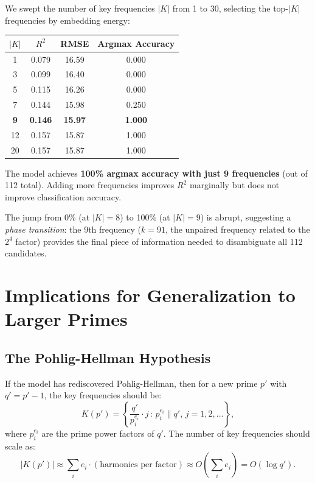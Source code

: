 \documentclass[11pt]{article}
\begin{document}
We swept the number of key frequencies $|K|$ from 1 to 30, selecting the top-$|K|$ frequencies by embedding energy:

\begin{center}
\begin{tabular}{cccc}
\toprule
$|K|$ & $R^2$ & RMSE & Argmax Accuracy \\
\midrule
1 & 0.079 & 16.59 & 0.000 \\
3 & 0.099 & 16.40 & 0.000 \\
5 & 0.115 & 16.26 & 0.000 \\
7 & 0.144 & 15.98 & 0.250 \\
\textbf{9} & \textbf{0.146} & \textbf{15.97} & \textbf{1.000} \\
12 & 0.157 & 15.87 & 1.000 \\
20 & 0.157 & 15.87 & 1.000 \\
\bottomrule
\end{tabular}
\end{center}

The model achieves \textbf{100\% argmax accuracy with just 9 frequencies} (out of 112 total). Adding more frequencies improves $R^2$ marginally but does not improve classification accuracy.

The jump from 0\% (at $|K|=8$) to 100\% (at $|K|=9$) is abrupt, suggesting a \emph{phase transition}: the 9th frequency ($k = 91$, the unpaired frequency related to the $2^4$ factor) provides the final piece of information needed to disambiguate all 112 candidates.


\section{Implications for Generalization to Larger Primes}

\subsection{The Pohlig-Hellman Hypothesis}

If the model has rediscovered Pohlig-Hellman, then for a new prime $p'$ with $q' = p' - 1$, the key frequencies should be:
\begin{equation}
    K(p') = \left\{ \frac{q'}{p_i^{e_i}} \cdot j \,:\, p_i^{e_i} \| q', \, j = 1, 2, \ldots \right\},
\end{equation}
where $p_i^{e_i}$ are the prime power factors of $q'$. The number of key frequencies should scale as:
\begin{equation}
    |K(p')| \approx \sum_{i} e_i \cdot (\text{harmonics per factor}) \approx O\!\left(\sum_i e_i\right) = O(\log q').
\end{equation}
\end{document}
